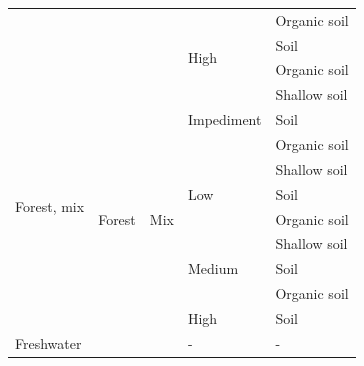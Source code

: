\documentclass{article}
\begin{document}
\begin{longtable}{ p{4cm} | p{4cm} l l l}
                        &                           &                           &                                   &       Organic soil \\ \cline{5-5}
\cline{4-5}
                        &                           &                           &       \multirow{2}{*}{High}       &       Soil \\         \cline{5-5}
                        &                           &                           &                                   &       Organic soil \\ \cline{5-5}
\hline
\multirow{10}{*}{Forest, mix}   & \multirow{11}{*}{Forest} &    \multirow{11}{*}{Mix} & \multirow{3}{*}{Impediment} & Shallow soil \\       \cline{5-5}
                        &                           &                           &                                   &       Soil \\         \cline{5-5}
                        &                           &                           &                                   &       Organic soil \\ \cline{5-5}
\cline{4-5}
                        &                           &                           &       \multirow{3}{*}{Low}        &       Shallow soil \\ \cline{5-5}
                        &                           &                           &                                   &       Soil \\         \cline{5-5}
                        &                           &                           &                                   &       Organic soil \\ \cline{5-5}
\cline{4-5}
                        &                           &                           &       \multirow{3}{*}{Medium}     &       Shallow soil \\ \cline{5-5}
                        &                           &                           &                                   &       Soil \\         \cline{5-5}
                        &                           &                           &                                   &       Organic soil \\ \cline{5-5}
\cline{4-5}
                        &                           &                           &       High                        &       Soil \\         \cline{5-5}
\hline
Freshwater              &   Freshwater              &       -                   &       -                           &       -  \\       

\end{longtable}
\end{document}
